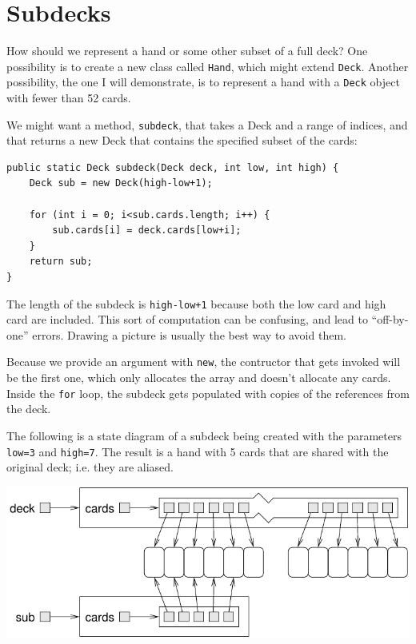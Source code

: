 \documentclass[12pt]{book}
\theoremstyle{exercise}
\begin{document}
\section {Subdecks}

How should we represent a hand or some other subset of a full deck?
One possibility is to create a new class called {\tt Hand}, which
might extend {\tt Deck}.  Another possibility, the one I will
demonstrate, is to represent a hand with a {\tt Deck} object with
fewer than 52 cards.

We might want a method, {\tt subdeck}, that takes a Deck
and a range of indices, and that returns a new Deck that
contains the specified subset of the cards:

\begin{lstlisting}
public static Deck subdeck(Deck deck, int low, int high) {
    Deck sub = new Deck(high-low+1);

    for (int i = 0; i<sub.cards.length; i++) {
        sub.cards[i] = deck.cards[low+i];
    }
    return sub;
}
\end{lstlisting}

The length of the subdeck is {\tt high-low+1} because both the low
card and high card are included.  This sort of computation can be
confusing, and lead to ``off-by-one'' errors.  Drawing a picture is
usually the best way to avoid them.

Because we provide an argument with {\tt new}, the
contructor that gets invoked will be the first one, which only
allocates the array and doesn't allocate any cards.  Inside the
{\tt for} loop, the subdeck gets populated with copies of the
references from the deck.

The following is a state diagram of a subdeck being created with the
parameters {\tt low=3} and {\tt high=7}.  The result is a hand with 5
cards that are shared with the original deck; i.e. they are aliased.

\includegraphics{figs/subdeck.pdf}
\end{document}
